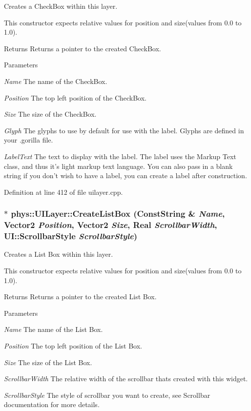 Creates a CheckBox within this layer. 

This constructor expects relative values for position and size(values from 0.0 to 1.0). \begin{DoxyReturn}{Returns}
Returns a pointer to the created CheckBox. 
\end{DoxyReturn}

\begin{DoxyParams}{Parameters}
\item[{\em Name}]The name of the CheckBox. \item[{\em Position}]The top left position of the CheckBox. \item[{\em Size}]The size of the CheckBox. \item[{\em Glyph}]The glyphs to use by default for use with the label. Glyphs are defined in your .gorilla file. \item[{\em LabelText}]The text to display with the label. The label uses the Markup Text class, and thus it's light markup text language. You can also pass in a blank string if you don't wish to have a label, you can create a label after construction. \end{DoxyParams}


Definition at line 412 of file uilayer.cpp.

\hypertarget{classphys_1_1UILayer_ac0901ce99a6fa2e3f4c2b8a44239349e}{
\subsubsection[{CreateListBox}]{ $\ast$ phys::UILayer::CreateListBox ({\bf ConstString} \& {\em Name}, \/  {\bf Vector2} {\em Position}, \/  {\bf Vector2} {\em Size}, \/  {\bf Real} {\em ScrollbarWidth}, \/  UI::ScrollbarStyle {\em ScrollbarStyle})}}
\label{da/d48/classphys_1_1UILayer_ac0901ce99a6fa2e3f4c2b8a44239349e}


Creates a List Box within this layer. 

This constructor expects relative values for position and size(values from 0.0 to 1.0). \begin{DoxyReturn}{Returns}
Returns a pointer to the created List Box. 
\end{DoxyReturn}

\begin{DoxyParams}{Parameters}
\item[{\em Name}]The name of the List Box. \item[{\em Position}]The top left position of the List Box. \item[{\em Size}]The size of the List Box. \item[{\em ScrollbarWidth}]The relative width of the scrollbar thats created with this widget. \item[{\em ScrollbarStyle}]The style of scrollbar you want to create, see Scrollbar documentation for more details. \end{DoxyParams}


